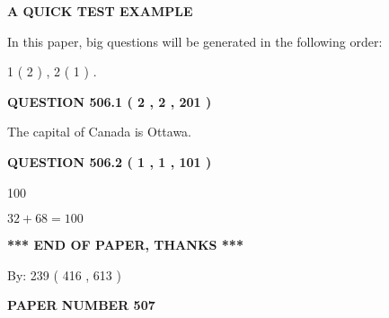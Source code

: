 \documentclass[12pt]{article}
\begin{document}
   
   
   
 \vspace{0.2in}
{\LARGE {\textbf{ A QUICK TEST EXAMPLE}}}
   
   
   
\vspace{0.2in}
   
In this paper, big questions will be generated in the following order: 
   
   
   1 ( 2 )
 ,
   2 ( 1 )
 .
  
\vspace{0.2in}
  
{\textbf{\Large{QUESTION
506.1 
 ( 2 , 2 , 201 )
}}}
  
  
 
 
\noindent{}
 
 
The capital of Canada is Ottawa.
 
 
 
 
  
\vspace{0.2in}
  
{\textbf{\Large{QUESTION
506.2 
 ( 1 , 1 , 101 )
}}}
  
  
 
 
\noindent{}

100
 
 
 
 
\noindent{}

$ %
32 +  %
68=   %
100$
 
 
   
   
 \vspace{0.2in}
 
   
   
   
   
\vspace{1.0in} 
{\textbf{\large{ *** END OF PAPER, THANKS *** }}} 
   
   
\hspace{1.0in} By: 
 239 ( 416 ,  613 )
   
   
   
   
\newpage 
\setcounter{page}{ 
   507001 } 
   
   
   
   
 {\textbf{ \Large{ PAPER NUMBER  507  }}}
   
\end{document}
